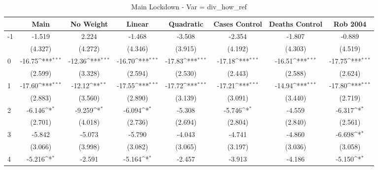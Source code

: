 \documentclass{article}
\begin{document}
{
\def\sym#1{\ifmmode^{#1}\else\(^{#1}\)\fi}
\begin{longtable}{l*{7}{c}}
\caption{Main Lockdown - Var = div\_how\_ref}\\
\hline\hline\endfirsthead\hline\endhead\hline\endfoot\endlastfoot
                &\multicolumn{1}{c}{Main}&\multicolumn{1}{c}{No Weight}&\multicolumn{1}{c}{Linear}&\multicolumn{1}{c}{Quadratic}&\multicolumn{1}{c}{Cases Control}&\multicolumn{1}{c}{Deaths Control}&\multicolumn{1}{c}{Rob 2004}\\
\hline
-1              &   -1.519         &    2.224         &   -1.468         &   -3.508         &   -2.354         &   -1.807         &   -0.889         \\
                &  (4.327)         &  (4.272)         &  (4.346)         &  (3.915)         &  (4.192)         &  (4.303)         &  (4.519)         \\
0               &   -16.75\sym{***}&   -12.36\sym{***}&   -16.70\sym{***}&   -17.83\sym{***}&   -17.18\sym{***}&   -16.51\sym{***}&   -17.75\sym{***}\\
                &  (2.599)         &  (3.328)         &  (2.594)         &  (2.530)         &  (2.443)         &  (2.588)         &  (2.624)         \\
1               &   -17.60\sym{***}&   -12.12\sym{**} &   -17.55\sym{***}&   -17.72\sym{***}&   -17.21\sym{***}&   -14.94\sym{***}&   -17.80\sym{***}\\
                &  (2.883)         &  (3.560)         &  (2.890)         &  (3.139)         &  (3.091)         &  (3.440)         &  (2.719)         \\
2               &   -6.146\sym{*}  &   -9.259\sym{*}  &   -6.094\sym{*}  &   -5.308         &   -5.746\sym{*}  &   -4.559         &   -6.317\sym{*}  \\
                &  (2.701)         &  (4.018)         &  (2.736)         &  (2.694)         &  (2.804)         &  (2.840)         &  (2.561)         \\
3               &   -5.842         &   -5.073         &   -5.790         &   -4.043         &   -4.741         &   -4.860         &   -6.698\sym{*}  \\
                &  (3.066)         &  (3.998)         &  (3.082)         &  (3.065)         &  (3.197)         &  (3.036)         &  (3.058)         \\
4               &   -5.216\sym{*}  &   -2.591         &   -5.164\sym{*}  &   -2.457         &   -3.913         &   -4.186         &   -5.150\sym{*}  \\

\end{longtable}}
\end{document}
